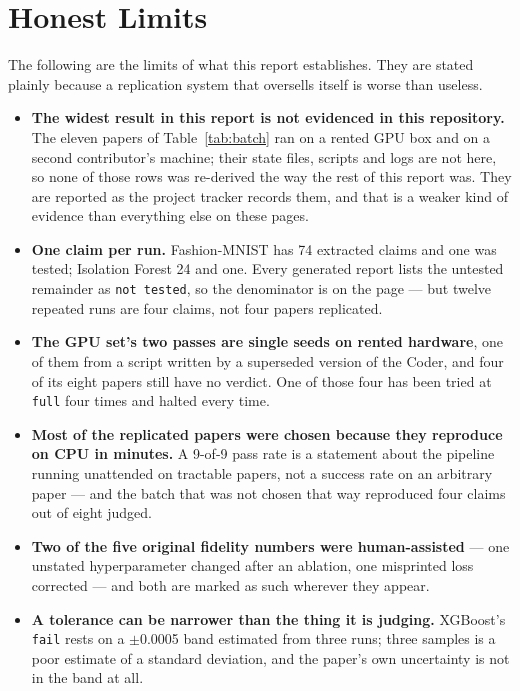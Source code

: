 \documentclass[11pt]{article}
\begin{document}
\section{Honest Limits}
\label{sec:limits}

The following are the limits of what this report establishes. They are stated plainly because a
replication system that oversells itself is worse than useless.

\begin{itemize}
  \item \textbf{The widest result in this report is not evidenced in this repository.} The eleven
    papers of Table~\ref{tab:batch} ran on a rented GPU box and on a second contributor's machine;
    their state files, scripts and logs are not here, so none of those rows was re-derived the way
    the rest of this report was. They are reported as the project tracker records them, and that
    is a weaker kind of evidence than everything else on these pages.
  \item \textbf{One claim per run.} Fashion-MNIST has 74 extracted claims and one was tested;
    Isolation Forest 24 and one. Every generated report lists the untested remainder as
    \texttt{not tested}, so the denominator is on the page --- but twelve repeated runs are four
    claims, not four papers replicated.
  \item \textbf{The GPU set's two passes are single seeds on rented hardware}, one of them from a
    script written by a superseded version of the Coder, and four of its eight papers still have
    no verdict. One of those four has been tried at \texttt{full} four times and halted every
    time.
  \item \textbf{Most of the replicated papers were chosen because they reproduce on CPU in
    minutes.} A 9-of-9 pass rate is a statement about the pipeline running unattended on tractable
    papers, not a success rate on an arbitrary paper --- and the batch that was not chosen that way
    reproduced four claims out of eight judged.
  \item \textbf{Two of the five original fidelity numbers were human-assisted} --- one unstated
    hyperparameter changed after an ablation, one misprinted loss corrected --- and both are
    marked as such wherever they appear.
  \item \textbf{A tolerance can be narrower than the thing it is judging.} XGBoost's
    \texttt{fail} rests on a $\pm$0.0005 band estimated from three runs; three samples is a poor
    estimate of a standard deviation, and the paper's own uncertainty is not in the band at all.

\end{itemize}
\end{document}
